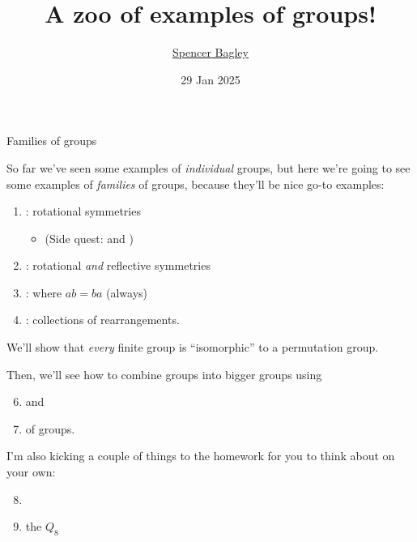 \documentclass[8pt, handout]{beamer}
\newcommand{\Pause}{}      %
\begin{document}

\title[A zoo of examples of groups!]{A zoo of examples of groups!}

\author[\href{mailto:sbagley@westminsteru.edu}{S. Bagley}]
       {\href{mailto:sbagley@westminsteru.edu}{Spencer Bagley}}


\date[29 Jan 2025]{29 Jan 2025}

\frame{\titlepage}


\begin{frame}{Families of groups} %

  So far we've seen some examples of \textit{individual} groups, but here we're going to see some examples of \textit{families} of groups, because they'll be nice go-to examples:

  \begin{enumerate}
  \item \textbf{}: rotational symmetries
  \begin{itemize}
    \item (Side quest:  and ) \Pause
  \end{itemize}
  \item \textbf{}: rotational \emph{and}
    reflective symmetries \Pause
  \item \textbf{}: where $ab=ba$ (always) \Pause
  \item \textbf{}: collections of
    rearrangements. \Pause
  \end{enumerate}

  We'll show that \emph{every} finite group is ``isomorphic'' to a
  permutation group. \medskip\Pause

  Then, we'll see how to combine groups into bigger groups using
  
  \begin{enumerate}
    \setcounter{enumi}{5}
  \item \textbf{} and 
  \item \textbf{} of groups.  \Pause
  \end{enumerate}

  I'm also kicking a couple of things to the homework for you to think about on your own:

  \begin{enumerate}
    \setcounter{enumi}{7}
    \item \textbf{}
    \item the \textbf{} $Q_8$
  \end{enumerate}


  
  
\end{frame}
\end{document}
